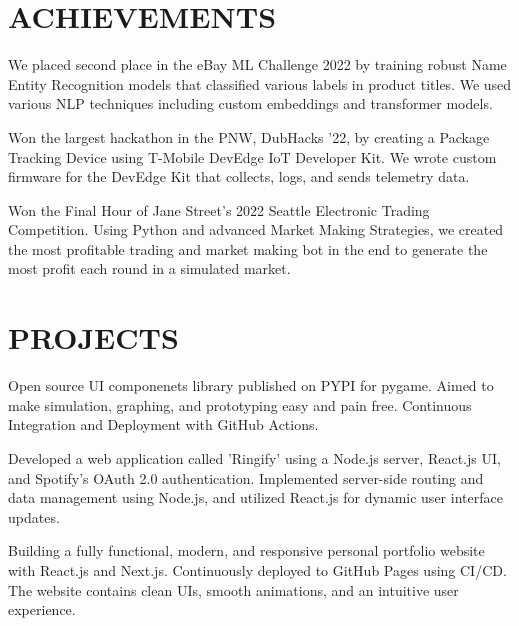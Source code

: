 \documentclass[]{main}
\begin{document}
\begin{minipage}[t]{0.66\textwidth}

\section{ACHIEVEMENTS}


We placed second place in the eBay ML Challenge 2022 by training robust Name Entity Recognition models that classified various labels in product titles. We used various NLP techniques including custom embeddings and transformer models.
\sectionsep


Won the largest hackathon in the PNW, DubHacks '22, by creating a Package Tracking Device using T-Mobile DevEdge IoT Developer Kit. We wrote custom firmware for the DevEdge Kit that collects, logs, and sends telemetry data.
\sectionsep


Won the Final Hour of Jane Street's 2022 Seattle Electronic Trading Competition. Using Python and advanced Market Making Strategies, we created the most profitable trading and market making bot in the end to generate the most profit each round in a simulated market.
\sectionsep



\section{PROJECTS}
Open source UI componenets library published on PYPI for pygame. Aimed to make simulation, graphing, and prototyping easy and pain free. Continuous Integration and Deployment with GitHub Actions. 
\sectionsep

Developed a web application called 'Ringify' using a Node.js server, React.js UI, and Spotify's OAuth 2.0 authentication. Implemented server-side routing and data management using Node.js, and utilized React.js for dynamic user interface updates.
\sectionsep

Building a fully functional, modern, and responsive personal portfolio website with React.js and Next.js. Continuously deployed to GitHub Pages using CI/CD. The website contains clean UIs, smooth animations, and an intuitive user experience.

\sectionsep

\end{minipage} 
\end{document}
